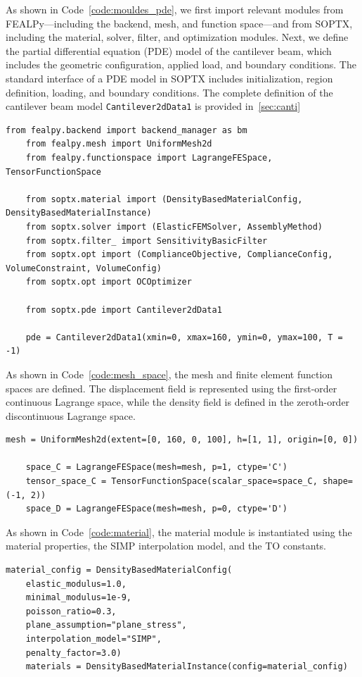 \documentclass[mathpazo]{cicp}
\begin{document}
As shown in Code~\ref{code:mouldes_pde}, we first import relevant modules from FEALPy---including the backend, mesh, and function space---and from SOPTX, including the material, solver, filter, and optimization modules. Next, we define the partial differential equation (PDE) model of the cantilever beam, which includes the geometric configuration, applied load, and boundary conditions. The standard interface of a PDE model in SOPTX includes initialization, region definition, loading, and boundary conditions. The complete definition of the cantilever beam model \texttt{Cantilever2dData1} is provided in~\ref{sec:canti}
\begin{lstlisting}[caption={Module imports and PDE model}, label={code:mouldes_pde}]
	from fealpy.backend import backend_manager as bm
	from fealpy.mesh import UniformMesh2d
	from fealpy.functionspace import LagrangeFESpace, TensorFunctionSpace
	
	from soptx.material import (DensityBasedMaterialConfig, DensityBasedMaterialInstance)
	from soptx.solver import (ElasticFEMSolver, AssemblyMethod)
	from soptx.filter_ import SensitivityBasicFilter
	from soptx.opt import (ComplianceObjective, ComplianceConfig, VolumeConstraint, VolumeConfig)
	from soptx.opt import OCOptimizer
	
	from soptx.pde import Cantilever2dData1
	
	pde = Cantilever2dData1(xmin=0, xmax=160, ymin=0, ymax=100,	T = -1)
\end{lstlisting}

As shown in Code~\ref{code:mesh_space}, the mesh and finite element function spaces are defined. The displacement field is represented using the first-order continuous Lagrange space, while the density field is defined in the zeroth-order discontinuous Lagrange space.
\begin{lstlisting}[caption={Mesh and function space definitions}, label={code:mesh_space}]
	mesh = UniformMesh2d(extent=[0, 160, 0, 100], h=[1, 1], origin=[0, 0])
	
	space_C = LagrangeFESpace(mesh=mesh, p=1, ctype='C')
	tensor_space_C = TensorFunctionSpace(scalar_space=space_C, shape=(-1, 2))
	space_D = LagrangeFESpace(mesh=mesh, p=0, ctype='D')
\end{lstlisting}

As shown in Code~\ref{code:material}, the material module is instantiated using the material properties, the SIMP interpolation model, and the TO constants.

\begin{lstlisting}[caption={Material module}, label={code:material}]
	material_config = DensityBasedMaterialConfig(
	elastic_modulus=1.0,            
	minimal_modulus=1e-9,         
	poisson_ratio=0.3,            
	plane_assumption="plane_stress",    
	interpolation_model="SIMP",    
	penalty_factor=3.0)
	materials = DensityBasedMaterialInstance(config=material_config)
\end{lstlisting}
	
\end{document}
